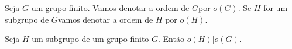 \documentclass{beamer}
\begin{document}
%
    \begin{frame}

        \begin{observacao}
            Seja $G$ um grupo finito. \pause Vamos denotar a ordem de $G$\pause  por $o(G)$. \pause Se $H$ for um subgrupo de $G$\pause  vamos denotar a ordem de $H$ por $o(H)$.\pause
        \end{observacao}
        \begin{teorema}
            Seja $H$ um subgrupo \pause de um grupo finito $G$. \pause Então $o(H) | o(G)$.
        \end{teorema}
    \end{frame}
\end{document}
